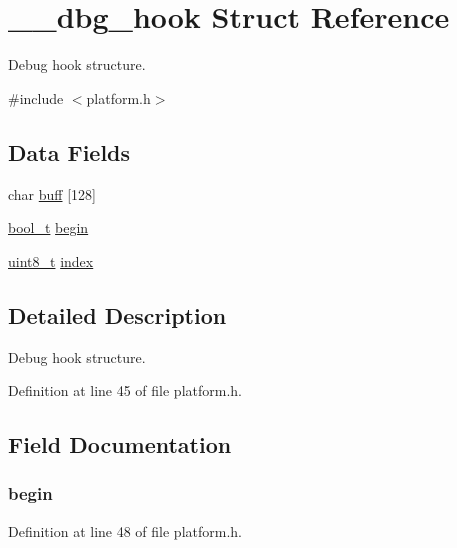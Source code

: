\hypertarget{struct____dbg__hook}{
\section{\_\-\_\-dbg\_\-hook Struct Reference}
\label{struct____dbg__hook}
}


Debug hook structure.  




{\ttfamily \#include $<$platform.h$>$}

\subsection*{Data Fields}
\begin{DoxyCompactItemize}
\item 
char \hyperlink{struct____dbg__hook_a347b80c6b82d149467f123c6a95679cf}{buff} \mbox{[}128\mbox{]}
\item 
\hyperlink{platform_8h_a449976458a084f880dc8e3d29e7eb6f5}{bool\_\-t} \hyperlink{struct____dbg__hook_ae8af0a83432f4ec4ed4dea73e467d6be}{begin}
\item 
\hyperlink{platform_8h_aba7bc1797add20fe3efdf37ced1182c5}{uint8\_\-t} \hyperlink{struct____dbg__hook_aae5a12e607d0f782506d9e6ec6179c64}{index}
\end{DoxyCompactItemize}


\subsection{Detailed Description}
Debug hook structure. 

Definition at line 45 of file platform.h.



\subsection{Field Documentation}
\hypertarget{struct____dbg__hook_ae8af0a83432f4ec4ed4dea73e467d6be}{
\subsubsection[{begin}]{ {\bf begin}}}
\label{struct____dbg__hook_ae8af0a83432f4ec4ed4dea73e467d6be}


Definition at line 48 of file platform.h.

